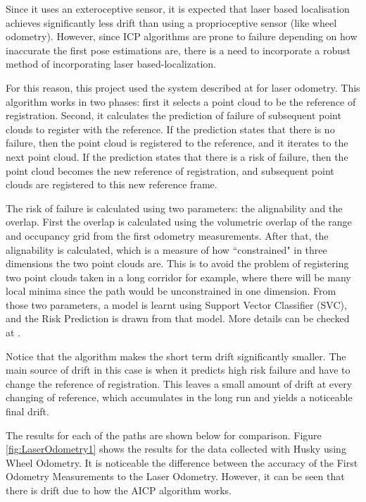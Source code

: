 \documentclass[11pt]{article}
\begin{document}
Since it uses an exteroceptive sensor, it is expected that laser based localisation achieves significantly less drift than using a proprioceptive sensor (like wheel odometry). However, since ICP algorithms are prone to failure depending on how inaccurate the first pose estimations are, there is a need to incorporate a robust method of incorporating laser based-localization.
	
For this reason, this project used the system described at \cite{AICPAlign} for laser odometry. This algorithm works in two phases: first it selects a point cloud to be the reference of registration. Second, it calculates the prediction of failure of subsequent point clouds to register with the reference. If the prediction states that there is no failure, then the point cloud is registered to the reference, and it iterates to the next point cloud. If the prediction states that there is a risk of failure, then the point cloud becomes the new reference of registration, and subsequent point clouds are registered to this new reference frame.
	
The risk of failure is calculated using two parameters: the alignability and the overlap. First the overlap is calculated using the volumetric overlap of the range and occupancy grid from the first odometry measurements. After that, the alignability is calculated, which is a measure of how ``constrained" in three dimensions the two point clouds are. This is to avoid the problem of registering two point clouds taken in a long corridor for example, where there will be many local minima since the path would be unconstrained in one dimension. From those two parameters, a model is learnt using Support Vector Classifier (SVC), and the Risk Prediction is drawn from that model. More details can be checked at \cite{AICPAlign}.
	
Notice that the algorithm makes the short term drift significantly smaller. The main source of drift in this case is when it predicts high risk failure and have to change the reference of registration. This leaves a small amount of drift at every changing of reference, which accumulates in the long run and yields a noticeable final drift.
	
The results for each of the paths are shown below for comparison. Figure \ref{fig:LaserOdometry1} shows the results for the data collected with Husky using Wheel Odometry. It is noticeable the difference between the accuracy of the First Odometry Measurements to the Laser Odometry. However, it can be seen that there is drift due to how the AICP algorithm works.
\end{document}
